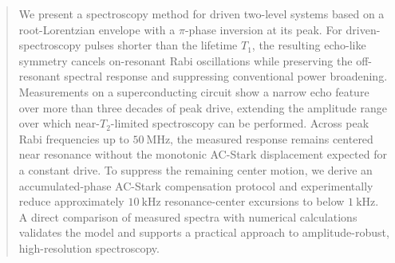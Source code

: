 \begin{abstract}
We present a spectroscopy method for driven two-level systems based on a root-Lorentzian envelope with a $\pi$-phase inversion at its peak. For driven-spectroscopy pulses shorter than the lifetime $T_1$, the resulting echo-like symmetry cancels on-resonant Rabi oscillations while preserving the off-resonant spectral response and suppressing conventional power broadening. Measurements on a superconducting circuit show a narrow echo feature over more than three decades of peak drive, extending the amplitude range over which near-$T_2$-limited spectroscopy can be performed. Across peak Rabi frequencies up to $50~\mathrm{MHz}$, the measured response remains centered near resonance without the monotonic AC-Stark displacement expected for a constant drive. To suppress the remaining center motion, we derive an accumulated-phase AC-Stark compensation protocol and experimentally reduce approximately $10~\mathrm{kHz}$ resonance-center excursions to below $1~\mathrm{kHz}$. A direct comparison of measured spectra with numerical calculations validates the model and supports a practical approach to amplitude-robust, high-resolution spectroscopy.
\end{abstract}
